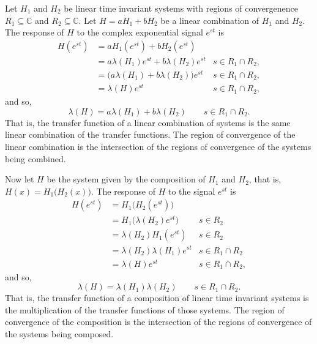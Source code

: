 \documentclass[11pt,a4paper]{book}
\theoremstyle{plain}
\numberwithin{equation}{section}
\newcommand{\complex}{{\mathbb C}}
\begin{document}

Let $H_1$ and $H_2$ be linear time invariant systems with regions of convergenence $R_1 \subseteq \complex$ and $R_2\subseteq \complex$.  Let $H = a H_1 + bH_2$ be a linear combination of $H_1$ and $H_2$.  The response of $H$ to the complex exponential signal $e^{st}$ is
\begin{align*}
H(e^{st}) &= a H_1(e^{st}) + b H_2(e^{st}) \\
&= a\lambda(H_1)e^{st} + b\lambda(H_2)e^{st} & s \in R_1 \cap R_2, \\
&= \big( a\lambda(H_1) + b\lambda(H_2) \big) e^{st} & s \in R_1 \cap R_2,\\
&= \lambda(H) e^{st} & s \in R_1 \cap R_2,
\end{align*}
and so,
\[
\lambda(H) = a\lambda(H_1) + b\lambda(H_2) \qquad s \in R_1 \cap R_2.
\]
That is, the transfer function of a linear combination of systems is the same linear combination of the transfer functions.  The region of convergence of the linear combination is the intersection of the regions of convergence of the systems being combined.


Now let $H$ be the system given by the composition of $H_1$ and $H_2$, that is, $H(x) = H_1\big(H_2(x)\big)$.  The response of $H$ to the signal $e^{st}$ is
\begin{align*}
H(e^{st}) &= H_1\big(H_2(e^{st})\big) \\
&= H_1\big(\lambda(H_2) e^{st} \big) & s \in R_2\\
&= \lambda(H_2)H_1(e^{st}) & s \in R_2 \\
&= \lambda(H_2)\lambda(H_1) e^{st} & s \in R_1 \cap R_2 \\
&= \lambda(H) e^{st} & s \in R_1 \cap R_2,
\end{align*}
and so, 
\begin{equation}\label{eq:composedtransferfunction}
\lambda(H) = \lambda(H_1)\lambda(H_2) \qquad s \in R_1 \cap R_2.
\end{equation}
That is, the transfer function of a composition of linear time invariant systems is the multiplication of the transfer functions of those systems.  The region of convergence of the composition is the intersection of the regions of convergence of the systems being composed.
\end{document}

